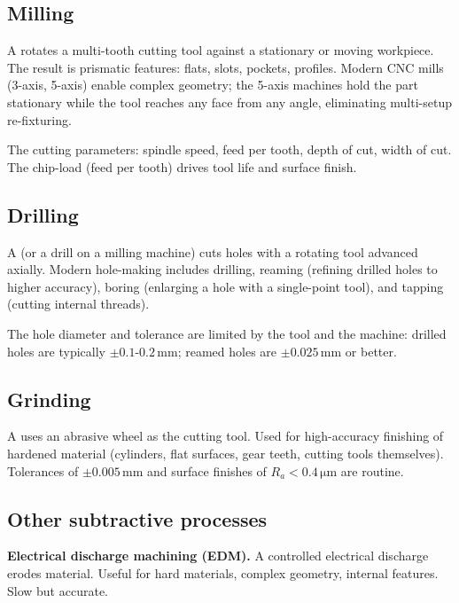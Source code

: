 \subsection{Milling}

A  rotates a multi-tooth cutting tool against a stationary or moving workpiece. The result is prismatic features: flats, slots, pockets, profiles. Modern CNC mills (3-axis, 5-axis) enable complex geometry; the 5-axis machines hold the part stationary while the tool reaches any face from any angle, eliminating multi-setup re-fixturing.

The cutting parameters: spindle speed, feed per tooth, depth of cut, width of cut. The chip-load (feed per tooth) drives tool life and surface finish.

\subsection{Drilling}

A  (or a drill on a milling machine) cuts holes with a rotating tool advanced axially. Modern hole-making includes drilling, reaming (refining drilled holes to higher accuracy), boring (enlarging a hole with a single-point tool), and tapping (cutting internal threads).

The hole diameter and tolerance are limited by the tool and the machine: drilled holes are typically $\pm 0.1$-$0.2\,\si{\milli\meter}$; reamed holes are $\pm 0.025\,\si{\milli\meter}$ or better.

\subsection{Grinding}

A  uses an abrasive wheel as the cutting tool. Used for high-accuracy finishing of hardened material (cylinders, flat surfaces, gear teeth, cutting tools themselves). Tolerances of $\pm 0.005\,\si{\milli\meter}$ and surface finishes of $R_a < 0.4\,\si{\micro\meter}$ are routine.

\subsection{Other subtractive processes}

\textbf{Electrical discharge machining (EDM).} A controlled electrical discharge erodes material. Useful for hard materials, complex geometry, internal features. Slow but accurate.


